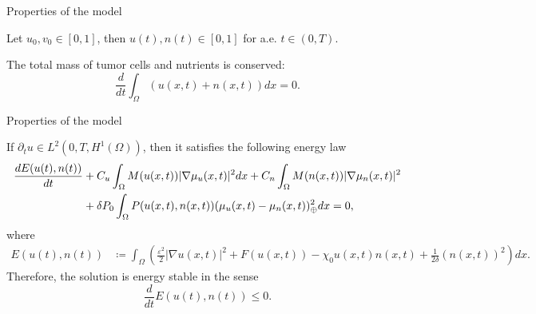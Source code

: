 \begin{frame}{Properties of the model}
	\begin{proposition}
		Let $u_0,v_0\in[0,1]$, then $u(t),n(t)\in[0,1]$ for a.e. $t\in(0,T)$.
	\end{proposition}
	\begin{proposition}
		The total mass of tumor cells and nutrients is conserved: $$\frac{d}{dt}\int_\Omega (u(x,t)+n(x,t))dx=0.$$
	\end{proposition}
\end{frame}
\begin{frame}{Properties of the model}
	\scriptsize
	\begin{proposition}
		If $\partial_t u\in L^2(0,T, H^1(\Omega))$, then it satisfies the following energy law
		\begin{align*}
			\frac{d E(u(t),n(t))}{dt}&+C_u\int_\Omega M(u(x,t))|\nabla\mu_u(x,t)|^2dx+C_n\int_\Omega M(n(x,t))|\nabla\mu_n(x,t)|^2\notag\\&+\delta P_0\int_\Omega P(u(x,t),n(x,t))(\mu_u(x,t)-\mu_n(x,t))_\oplus ^2dx=0,
		\end{align*}
		where
		\begin{align*}
			E(u(t),n(t))&\coloneqq\int_\Omega\left(\frac{\varepsilon^2}{2}|\nabla u(x,t)|^2+ F(u(x,t))-\chi_0u(x,t)n(x,t)+\frac{1}{2\delta}\left(n(x,t)\right)^2\right)dx.
		\end{align*}
		Therefore, the solution is energy stable in the sense $$\frac{d}{dt}E(u(t),n(t))\le 0.$$
	\end{proposition}
\end{frame}

